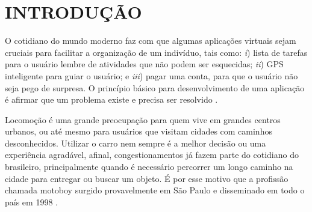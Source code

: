
\chapter{INTRODUÇÃO}


O cotidiano do mundo moderno faz com que algumas aplicações virtuais sejam cruciais para facilitar a organização de um indivíduo, tais como: \textit{i}) lista de tarefas para o usuário lembre de atividades que não podem ser esquecidas; \textit{ii}) GPS inteligente para guiar o usuário; e \textit{iii}) pagar uma conta, para que o usuário não seja pego de surpresa. O princípio básico para desenvolvimento de uma aplicação é afirmar que um problema existe e precisa ser resolvido \cite{desenvWebFrame}.


Locomoção é uma grande preocupação para quem vive em grandes centros urbanos, ou até mesmo para usuários que visitam cidades com caminhos desconhecidos. Utilizar o carro nem sempre é a melhor decisão ou uma experiência agradável, afinal, congestionamentos já fazem parte do cotidiano do brasileiro, principalmente quando é necessário percorrer um longo caminho na cidade para entregar ou buscar um objeto. É por esse motivo que a profissão chamada motoboy surgido provavelmente em São Paulo e disseminado em todo o país em 1998 \cite{MotoboyVeja}.

